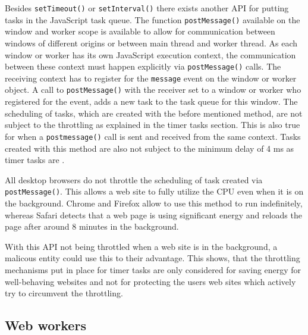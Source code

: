 \documentclass[article,type=bsc,colorback,accentcolor=tud9c]{tudthesis}
\begin{document}
  Besides \texttt{setTimeout()} or \texttt{setInterval()} there exists another API for putting tasks in the JavaScript task queue. The function \texttt{postMessage()} available on the window and worker scope is available to allow for communication between windows of different origins or between main thread and worker thread. As each window or worker has its own JavaScript execution context, the communication between these context must happen explicitly via \texttt{postMessage()} calls. The receiving context has to register for the \texttt{message} event on the window or worker object. A call to \texttt{postMessage()} with the receiver set to a window or worker who registered for the event, adds a new task to the task queue for this window. The scheduling of tasks, which are created with the before mentioned method, are not subject to the throttling as explained in the timer tasks section. This is also true for when a \texttt{postmessage()} call is sent and received from the same context. Tasks created with this method are also not subject to the minimum delay of 4 ms as timer tasks are \cite{zero-delay-timeouts}.

  All desktop browsers do not throttle the scheduling of task created via \texttt{postMessage()}. This allows a web site to fully utilize the CPU even when it is on the background. Chrome and Firefox allow to use this method to run indefinitely, whereas Safari detects that a web page is using significant energy and reloads the page after around 8 minutes in the background.

  With this API not being throttled when a web site is in the background, a malicous entity could use this to their advantage. This shows, that the throttling mechanisms put in place for timer tasks are only considered for saving energy for well-behaving websites and not for protecting the users web sites which actively try to circumvent the throttling.
  

  
  \subsection{Web workers}
\end{document}

